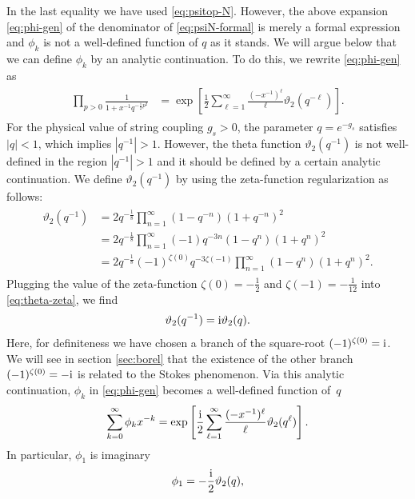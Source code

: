 \documentclass[11pt]{article}
\newcommand{\ri}{{\rm i}}
\newcommand{\hf}{\frac{1}{2}}
\renewcommand{\[}{\begin{eqnarray}}
\renewcommand{\]}{\end{eqnarray}}
\begin{document}
In the last equality we have used \eqref{eq:psitop-N}. 
However, the above expansion \eqref{eq:phi-gen}
of the denominator of \eqref{eq:psiN-formal}
is merely a formal expression and $\phi_k$ is not a well-defined function of
$q$ as it stands.
We will argue below that we can define 
$\phi_k$ by an analytic continuation.
To do this, we  rewrite \eqref{eq:phi-gen} as
\begin{align}
\begin{aligned}
\prod_{p>0}\frac{1}{1+x^{-1}q^{-\hf p^2}}
&=\exp\left[\hf\sum_{\ell=1}^\infty \frac{(-x^{-1})^\ell}{\ell}
\vartheta_2(q^{-\ell})\right].
\end{aligned}
\label{eq:hole-phi}
\end{align}
For the physical value of string coupling $g_s>0$,
the parameter $q=e^{-g_s}$ satisfies $|q|<1$, which implies $|q^{-1}|>1$.
However, the theta function $\vartheta_2(q^{-1})$ 
is not well-defined in the region $|q^{-1}|>1$ and it should be defined by 
a certain analytic continuation.
We define $\vartheta_2(q^{-1})$
by using the zeta-function regularization as follows:
\begin{align}
 \begin{aligned}
  \vartheta_2(q^{-1})&=2q^{-\frac{1}{8}}\prod_{n=1}^\infty(1-q^{-n})(1+q^{-n})^2\\
&=2q^{-\frac{1}{8}}\prod_{n=1}^\infty(-1)q^{-3n}(1-q^{n})(1+q^{n})^2\\
&=2q^{-\frac{1}{8}}(-1)^{\zeta(0)}q^{-3\zeta(-1)}\prod_{n=1}^\infty(1-q^{n})(1+q^{n})^2.
 \end{aligned}
\label{eq:theta-zeta}
\end{align}
Plugging the value of the zeta-function $\zeta(0)=-\hf$ and $\zeta(-1)=-\frac{1}{12}$
into \eqref{eq:theta-zeta}, we find
\begin{align}
 \vartheta_2(q^{-1})=\ri \vartheta_2(q).
\label{eq:acon}
\end{align}
Here, for definiteness we have chosen a branch of the square-root
$(-1)^{\zeta(0)}=\ri$.
We will see in section \ref{sec:borel} that
the existence of the other branch $(-1)^{\zeta(0)}=-\ri$
is related to the Stokes phenomenon. 
Via this analytic continuation, $\phi_k$ in \eqref{eq:phi-gen} becomes a well-defined 
function of~$q$
\begin{align}
 \sum_{k=0}^\infty \phi_kx^{-k}=
\exp\left[\frac{\ri}{2}\sum_{\ell=1}^\infty \frac{(-x^{-1})^\ell}{\ell}
\vartheta_2(q^{\ell})\right].
\end{align}
In particular, $\phi_1$ is imaginary
\begin{align}
 \phi_1=-\frac{\ri}{2}\vartheta_2(q),
\end{align}
\end{document}
